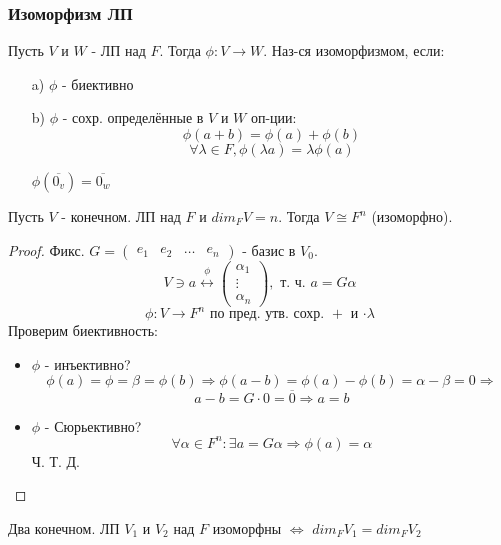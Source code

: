 \subsubsection{Изоморфизм ЛП}
\begin{definition}
Пусть $V$ и $W$ - ЛП над $F$. Тогда $\phi: V \rightarrow W$. Наз-ся изоморфизмом, если:
\begin{itemize}
  \item [a) ] $\phi$ - биективно
  \item [b) ] $\phi$ - сохр. определённые в $V$ и $W$ оп-ции:
    \[
    \phi(a + b) = \phi(a) + \phi(b)
    \]
    \[
    \forall \lambda \in F, \phi(\lambda a) = \lambda\phi(a)
    \]
    \begin{note}
    $\phi(\overline{0_v}) = \overline{0_w}$
    \end{note}
\end{itemize}
\end{definition}
\begin{theorem}
Пусть $V$ - конечном. ЛП над $F$ и $dim_F V = n$. Тогда $V \cong F^{n}$ (изоморфно).
\end{theorem}
\begin{proof}
  Фикс. $G = \begin{pmatrix} e_1 & e_2 & \ldots & e_n \end{pmatrix}$ - базис в $V_0$.
  \[
    V \ni a \overset{\phi}{\longleftrightarrow} \begin{pmatrix} \alpha_1 \\ \vdots \\ \alpha_n \end{pmatrix}, \text{ т. ч. } a = G \alpha
  \]
  \[
  \phi: V \rightarrow F^{n} \text{ по пред. утв. сохр. $+$ и $\cdot \lambda$}
  \]
  Проверим биективность:
  \begin{itemize}
    \item $\phi$ - инъективно? 
      \[
      \phi(a) = \phi = \beta = \phi(b) \Rightarrow \phi(a - b) = \phi(a) - \phi(b) = \alpha - \beta = 0 \Rightarrow 
      \]
      \[
      a - b = G \cdot 0 = \overline{0} \Rightarrow a = b
      \]
    \item $\phi$ - Сюрьективно?
      \[
      \forall \alpha \in F^{n} \colon \exists a = G \alpha \Rightarrow \phi(a) = \alpha
      \]
      Ч. Т. Д.
  \end{itemize}
\end{proof}
\begin{consequence}
Два конечном. ЛП $V_1$ и $V_2$ над $F$ изоморфны $\iff$ $dim_F V_1 = dim_F V_2$
\end{consequence}

